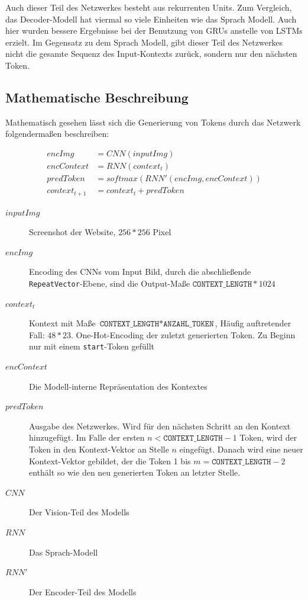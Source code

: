 \documentclass[pdftex,a4paper,halfparskip, article]{scrartcl}
\begin{document}
Auch dieser Teil des Netzwerkes besteht aus rekurrenten Units. Zum Vergleich, das Decoder-Modell hat viermal so viele Einheiten wie das Sprach Modell. Auch hier wurden bessere Ergebnisse bei der Benutzung von GRUs anstelle von LSTMs erzielt. Im Gegensatz zu dem Sprach Modell, gibt dieser Teil des Netzwerkes nicht die gesamte Sequenz des Input-Kontexts zurück, sondern nur den nächsten Token. 


\subsection{Mathematische Beschreibung}

Mathematisch gesehen lässt sich die Generierung von Tokens durch das Netzwerk folgendermaßen beschreiben:

\begin{equation}
\begin{aligned}
encImg  &= CNN(inputImg) \\
encContext &= RNN(context_t) \\
predToken &= softmax(RNN'(encImg, encContext)) \\
context_{t+1} &= context_t + predToken
\end{aligned}
\end{equation}


\begin{description}
	\item[$inputImg$] Screenshot der Website, $256 * 256$ Pixel
	\item[$encImg$] Encoding des CNNs vom Input Bild, durch die abschließende \texttt{RepeatVector}-Ebene, sind die Output-Maße $\texttt{CONTEXT\_LENGTH} * 1024$
	
	\item[$context_t$] Kontext mit Maße $\texttt{CONTEXT\_LENGTH} * \texttt{ANZAHL\_TOKEN}$, Häufig auftretender Fall: $48 * 23$. One-Hot-Encoding der zuletzt generierten Token. Zu Beginn nur mit einem \texttt{start}-Token gefüllt
	
	\item[$encContext$] Die Modell-interne Repräsentation des Kontextes
	\item[$predToken$] Ausgabe des Netzwerkes. Wird für den nächsten Schritt an den Kontext hinzugefügt. Im Falle der ersten $n < \texttt{CONTEXT\_LENGTH} - 1$ Token, wird der Token in den Kontext-Vektor an Stelle $n$ eingefügt. Danach wird eine neuer Kontext-Vektor gebildet, der die Token 1 bis $m = \texttt{CONTEXT\_LENGTH} - 2 $ enthält so wie den neu generierten Token an letzter Stelle. 
	\\
	\item[$CNN$] Der Vision-Teil des Modells
	\item[$RNN$] Das Sprach-Modell
	\item[$RNN'$] Der Encoder-Teil des Modells
\end{description}
\end{document}
